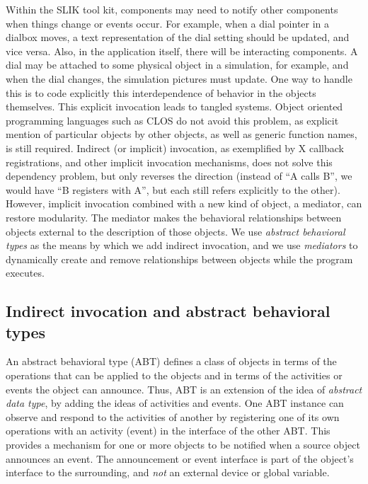 \documentclass[twoside,openright,11pt]{report}
\begin{document}
Within the SLIK tool kit, components may need to notify other
components when things change or events occur.  For example, when a
dial pointer in a dialbox moves, a text representation of the dial
setting should be updated, and vice versa.  Also, in the application
itself, there will be interacting components.  A dial may be attached
to some physical object in a simulation, for example, and when the
dial changes, the simulation pictures must update.  One way to handle
this is to code explicitly this interdependence of behavior in the
objects themselves.  This explicit invocation leads to tangled
systems. Object oriented programming languages such as CLOS do not
avoid this problem, as explicit mention of particular objects by other
objects, as well as generic function names, is still required.
Indirect (or implicit) invocation, as exemplified by X callback
registrations, and other implicit invocation mechanisms, does not
solve this dependency problem, but only reverses the direction
(instead of ``A calls B'', we would have ``B registers with A'', but
each still refers explicitly to the other).  However, implicit
invocation combined with a new kind of object, a mediator, can restore
modularity.  The mediator makes the behavioral relationships between
objects external to the description of those objects.  We use
\emph{abstract behavioral types} \cite{sullivan92} as the means by
which we add indirect invocation, and we use \emph{mediators}
\cite{sullivan94,sullivan96} to dynamically create and remove
relationships between objects while the program executes.

\subsection{Indirect invocation and abstract behavioral types}

An abstract behavioral type (ABT) defines a class of objects in terms
of the operations that can be applied to the objects and in terms of
the activities or events the object can announce.  Thus, ABT is an
extension of the idea of \emph{abstract data type}, by adding the
ideas of activities and events.  One ABT instance can observe and
respond to the activities of another by registering one of its own
operations with an activity (event) in the interface of the other ABT.
This provides a mechanism for one or more objects to be notified when
a source object announces an event.  The announcement or event
interface is part of the object's interface to the surrounding, and
\emph{not} an external device or global variable.
\end{document}

